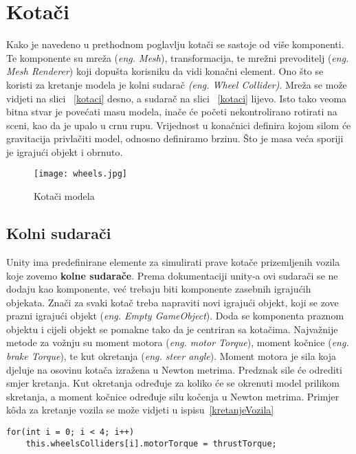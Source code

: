 \section{Kotači}
Kako je navedeno u prethodnom poglavlju kotači se sastoje od više komponenti. Te komponente su mreža (\emph{eng. Mesh}), transformacija, te mrežni prevoditelj (\emph{eng. Mesh Renderer}) koji dopušta korisniku da vidi konačni element. Ono što se koristi za kretanje modela je kolni sudarač \emph{(eng. Wheel Collider)}. Mreža se može vidjeti na slici ~\ref{kotaci} desno, a sudarač na slici ~\ref{kotaci} lijevo.
\vspace{2mm}
\newline Isto tako veoma bitna stvar je povećati masu modela, inače će početi nekontrolirano rotirati na sceni, kao da je upalo u crnu rupu. Vrijednost u konačnici definira kojom silom će gravitacija privlačiti model, odnosno definiramo brzinu. Što je masa veća sporiji je igrajući objekt i obrnuto.

\begin{figure}[h]
	\texttt{[image: wheels.jpg]}
	\centering
	\caption{Kotači modela}
	\label{fig:kotaci}
\end{figure}

\subsection{Kolni sudarači}
Unity ima predefinirane elemente za simulirati prave kotače prizemljenih vozila koje zovemo \textbf{kolne sudarače}. Prema dokumentaciji unity-a ovi sudarači se ne dodaju kao komponente, već trebaju biti komponente zasebnih igrajućih objekata. Znači za svaki kotač treba napraviti novi igrajući objekt, koji se zove prazni igrajući objekt (\emph{eng. Empty GameObject}). Doda se komponenta praznom objektu i cijeli objekt se pomakne tako da je centriran sa kotačima.
\vspace{2mm}
\newline
Najvažnije metode za vožnju su moment motora (\emph{eng. motor Torque}), moment kočnice (\emph{eng. brake Torque}), te kut okretanja (\emph{eng. steer angle}). Moment motora je sila koja djeluje na osovinu kotača izražena u Newton metrima. Predznak sile će odrediti smjer kretanja. Kut okretanja određuje za koliko će se okrenuti model prilikom skretanja, a moment kočnice određuje silu kočenja u Newton metrima. Primjer k\^oda za kretanje vozila se može vidjeti u ispisu~\ref{kretanjeVozila}


\begin{lstlisting}[caption={Skripta za kretanje vozila}, label=kretanjeVozila]
for(int i = 0; i < 4; i++)
    this.wheelsColliders[i].motorTorque = thrustTorque;
\end{lstlisting}

